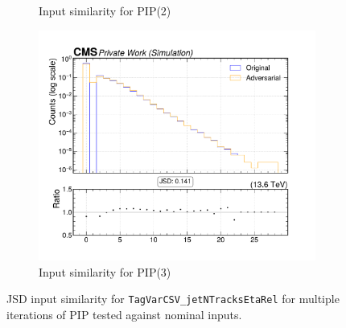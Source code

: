 \begin{figure}[htbp]
\begin{subfigure}[t]{0.32\textwidth}
    \caption{Input similarity for PIP(2)}
  \end{subfigure}\hfill
  \begin{subfigure}[t]{0.32\textwidth}
    \includegraphics[width=\linewidth]{media/output/features/compare/intprob_3/cmp_global_features_TagVarCSV_jetNTracksEtaRel.pdf}
    \caption{Input similarity for PIP(3)}
  \end{subfigure}

  \caption{JSD input similarity for \texttt{TagVarCSV\_jetNTracksEtaRel} for multiple iterations of PIP tested against nominal inputs.}
  \label{fig:intprob_input_TagVarCSV_jetNTracksEtaRel}
\end{figure}
